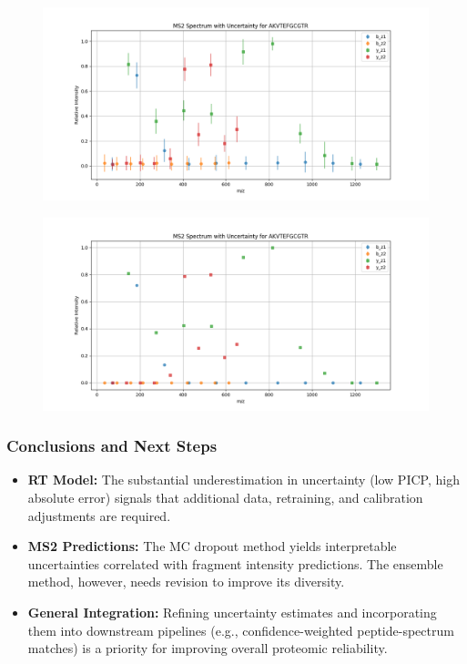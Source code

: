 \documentclass[10pt]{article}
\begin{document}
\begin{figure}[htbp]
\vspace{1em}
\begin{minipage}[b]{0.4\textwidth}
    \centering
    \includegraphics[width=\textwidth]{mc_dropout_ms2_uncertainty_AKVTEFGCGTR.png}
    \label{fig:mc_dropout_ms2}
\end{minipage}\hfill
\begin{minipage}[b]{0.4\textwidth}
    \centering
    \includegraphics[width=\textwidth]{ensemble_ms2_uncertainty_AKVTEFGCGTR.png}
    \label{fig:ensemble_ms2}
\end{minipage}
\end{figure}


\subsubsection*{Conclusions and Next Steps}
\begin{itemize}[noitemsep]
    \item \textbf{RT Model:}  
    The substantial underestimation in uncertainty (low PICP, high absolute error) signals that additional data, retraining, and calibration adjustments are required.
    \item \textbf{MS2 Predictions:}  
    The MC dropout method yields interpretable uncertainties correlated with fragment intensity predictions. The ensemble method, however, needs revision to improve its diversity.
    \item \textbf{General Integration:}  
    Refining uncertainty estimates and incorporating them into downstream pipelines (e.g., confidence-weighted peptide-spectrum matches) is a priority for improving overall proteomic reliability.
\end{itemize}
\end{document}
